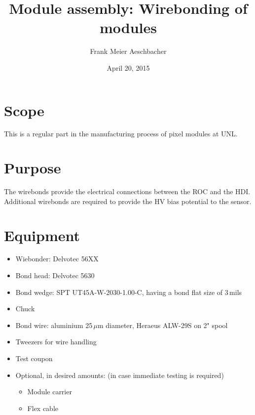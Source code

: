 \documentclass[12pt]{unlsilabsop}
\title{Module assembly: Wirebonding of modules}
\date{April 20, 2015}
\author{Frank Meier Aeschbacher}
\begin{document}
\maketitle

\section{Scope}
This is a regular part in the manufacturing process of pixel modules at UNL.

\section{Purpose}
The wirebonds provide the electrical connections between the ROC and the HDI. Additional wirebonds are required to provide the HV bias potential to the sensor.



\section{Equipment}

\begin{itemize}
    \item Wiebonder: Delvotec 56XX
    \item Bond head: Delvotec 5630
    \item Bond wedge: SPT UT45A-W-2030-1.00-C, having a bond flat size of 3\,mils
    \item Chuck
    \item Bond wire: aluminium 25\,$\mu$m diameter, Heraeus ALW-29S on 2" spool
    \item Tweezers for wire handling
    \item Test coupon
    \item Optional, in desired amounts: (in case immediate testing is required)
    \begin{itemize}
	\item Module carrier
	\item Flex cable
    \end{itemize}
\end{itemize}
\end{document}
